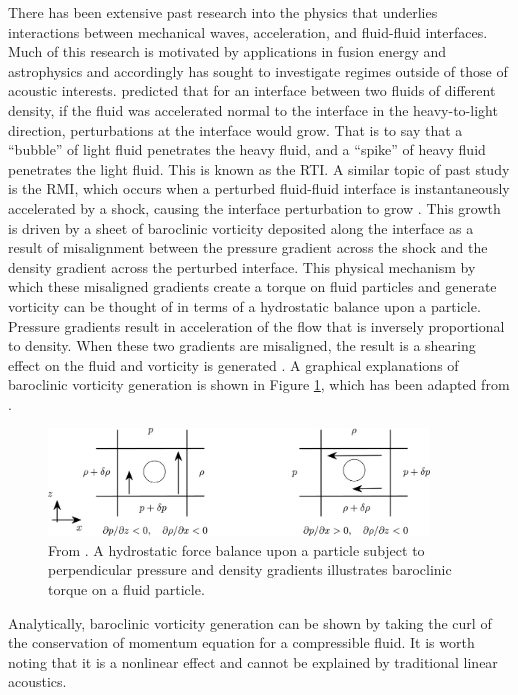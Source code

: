 There has been extensive past research into the physics that underlies
interactions between mechanical waves, acceleration, and fluid-fluid
interfaces. Much of this research is motivated by applications in
fusion energy and astrophysics and accordingly has sought to
investigate regimes outside of those of acoustic
interests. \cite{Taylor1950} predicted that for an interface between
two fluids of different density, if the fluid was accelerated normal
to the interface in the heavy-to-light direction, perturbations at the
interface would grow. That is to say that a ``bubble'' of light fluid
penetrates the heavy fluid, and a ``spike'' of heavy fluid penetrates
the light fluid. This is known as the \ac{RTI}. A similar topic of
past study is the \ac{RMI}, which occurs when a perturbed fluid-fluid
interface is instantaneously accelerated by a shock, causing the
interface perturbation to grow \citep{Brouillette2002,Drake2006}. This
growth is driven by a sheet of baroclinic vorticity deposited along
the interface as a result of misalignment between the pressure
gradient across the shock and the density gradient across the
perturbed interface. This physical mechanism by which these misaligned
gradients create a torque on fluid particles and generate vorticity
can be thought of in terms of a hydrostatic balance upon a
particle. Pressure gradients result in acceleration of the flow that
is inversely proportional to density. When these two gradients are
misaligned, the result is a shearing effect on the fluid and vorticity
is generated \citep{Heifetz2015}. A graphical explanations of
baroclinic vorticity generation is shown in Figure
\ref{fig:usbe_lung_baroclinic_schematic}, which has been adapted from \citep{Heifetz2015}.
\begin{figure}
  \centering
  \includegraphics[width=0.9\textwidth]{./figs/intro_figs/baroclinic_schematic} \hfill
 \caption[A schematic of baroclinic torque]{From
    \cite{Heifetz2015}. A hydrostatic force balance upon a particle
    subject to perpendicular pressure and density gradients
    illustrates baroclinic torque on a fluid particle.}
  \label{fig:usbe_lung_baroclinic_schematic}
\end{figure}
Analytically, baroclinic vorticity generation can be shown by taking
the curl of the conservation of momentum equation for a compressible
fluid. It is worth noting that it is a nonlinear effect and cannot be
explained by traditional linear acoustics.


